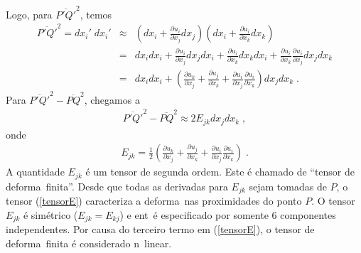 Logo, para $\overline{P'Q'}^2$, temos
\begin{eqnarray}
\overline{P'Q'}^2 = dx_i' \; dx_i' &\approx& \left(dx_i +
\frac{\partial u_i}{\partial x_j} dx_j\right) \left(dx_i +
\frac{\partial u_i}{\partial x_k} dx_k\right) \\
&=& dx_i dx_i +  \frac{\partial u_i}{\partial x_j} dx_j
dx_i + \frac{\partial u_i}{\partial x_k} dx_k  dx_i
+ \frac{\partial u_i}{\partial x_k} \frac{\partial u_i}
{\partial x_j} dx_j dx_k \\
&=& dx_i dx_i + \left( \frac{\partial u_k}{\partial x_j} +
\frac{\partial u_j}{\partial x_k} + \frac{\partial u_i}
{\partial x_j} \frac{\partial u_i}{\partial x_k}\right)
dx_j dx_k \; .
\end{eqnarray}
Para $\overline{P'Q'}^2 - \overline{PQ}^2$, chegamos a
\begin{eqnarray}
\overline{P'Q'}^2 - \overline{PQ}^2 \approx 2 E_{jk}
dx_j dx_k \; ,
\label{eq:def}
\end{eqnarray}
onde
\begin{eqnarray} \label{tensorE}
E_{jk} = \frac{1}{2} \left( \frac{\partial u_k}
{\partial x_j} + \frac{\partial u_j}{\partial x_k} +
\frac{\partial u_i}{\partial x_j} \frac{\partial u_i}
{\partial x_k}\right) \; .
\end{eqnarray}
A quantidade $E_{jk}$ \'e um tensor de segunda ordem.
Este \'e chamado de ``tensor de deforma\cao\ finita''.
Desde que todas as derivadas para $E_{jk}$ sejam tomadas
de $P$, o tensor (\ref{tensorE}) caracteriza a
deforma\cao\ nas proximidades do ponto $P$. O tensor
$E_{jk}$ \'e sim\'etrico ($E_{jk} = E_{kj}$) e ent\ao\ \'e
especificado por somente 6 componentes independentes. Por
causa do terceiro termo em (\ref{tensorE}), o tensor de
deforma\cao\ finita \'e considerado n\ao\ linear.

